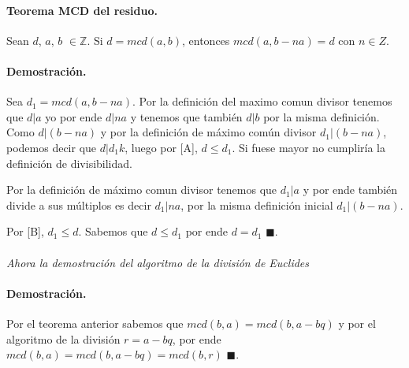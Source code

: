 \documentclass{article}
\begin{document}
	\paragraph{Teorema MCD del residuo.} Sean $d$, $a$, $b$ $\in \mathbb{Z}$.	Si $d = mcd(a,b)$, entonces $mcd(a, b-na)=d$ con $n \in Z$.
	
	\paragraph{Demostración.}Sea $d_1 = mcd(a,b-na)$. Por la definición del maximo comun divisor tenemos que $d|a$ yo por ende $d|na$ y tenemos que también $d|b$ por la misma definición. Como $d|(b-na)$ y por la definición de máximo común divisor $d_1|(b-na)$, podemos decir que $d|d_1k$, luego por [A], $d \leq d_1$. Si fuese mayor no cumpliría la definición de divisibilidad.
	
	Por la definición de máximo comun divisor tenemos que $d_1|a$ y por ende también divide a sus múltiplos es decir $d_1|na$, por la misma definición inicial $d_1|(b-na)$.
	
	Por [B], $d_1 \leq d$. Sabemos que $d \leq d_1$ por ende $d = d_1$ $\blacksquare$.
	
	\paragraph{} \textit{Ahora la demostración del algoritmo de la división de Euclides}
	\paragraph{Demostración.} Por el teorema anterior sabemos que $mcd(b,a) = mcd(b, a-bq)$ y por el algoritmo de la división $r = a - bq$, por ende $mcd(b,a) = mcd(b, a-bq) = mcd(b, r)$ $\blacksquare$.
\end{document}

